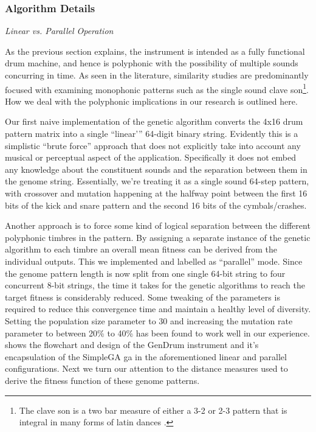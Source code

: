 \subsubsection*{Algorithm Details}

\textit{Linear vs. Parallel Operation}

As the previous section explains, the instrument is intended as a fully functional drum machine, and hence is polyphonic with the possibility of multiple sounds concurring in time. As seen in the literature, similarity studies are predominantly focused with examining monophonic patterns such as the single sound clave son\footnote{The clave son is a two bar measure of either a 3-2 or 2-3 pattern that is integral in many forms of latin dances \citep{Sethares2007}.}. How we deal with the polyphonic implications in our research is outlined here.

Our first naive implementation of the genetic algorithm converts the 4x16 drum pattern matrix into a single “linear'” 64-digit binary string. Evidently this is a simplistic ``brute force'' approach that does not explicitly take into account any musical or perceptual aspect of the application. Specifically it does not embed any knowledge about the constituent sounds and the separation between them in the genome string. Essentially, we’re treating it as a single sound 64-step pattern, with crossover and mutation happening at the halfway point between the first 16 bits of the kick and snare pattern and the second 16 bits of the cymbals/crashes. 

Another approach is to force some kind of logical separation between the different polyphonic timbres in the pattern. By assigning a separate instance of the genetic algorithm to each timbre an overall mean fitness can be derived from the individual outputs. This we implemented and labelled as ``parallel'' mode. Since the genome pattern length is now split from one single 64-bit string to four concurrent 8-bit strings, the time it takes for the genetic algorithms to reach the target fitness is considerably reduced. Some tweaking of the parameters is required to reduce this convergence time and maintain a healthy level of diversity. Setting the population size parameter to 30 and increasing the mutation rate parameter to between 20\% to 40\% has been found to work well in our experience.  shows the flowchart and design of the GenDrum instrument and it's encapsulation of the SimpleGA \acrshort{ga} in the aforementioned linear and parallel configurations. Next we turn our attention to the distance measures used to derive the fitness function of these genome patterns.

